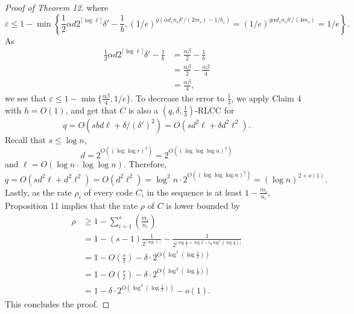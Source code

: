 \documentclass[10pt,a4paper]{article}
\begin{document}
\begin{proof}[Proof of Theorem 12]
where
\[\varepsilon\le1-\min\left\{\frac12\alpha d2^{\lceil\log\ell\rceil}\delta'-\frac1b,(1/e)^{g(\alpha d_s n_s\delta'/(2m_s)-1/b_s)}=(1/e)^{g\alpha d_s n_s\delta'/(4m_s)}=1/e\right\}.\]
As
\begin{align*}\frac12\alpha d2^{\lceil\log\ell\rceil}\delta'-\frac1b&=\frac{\alpha\beta}2-\frac1b\\&=\frac{\alpha\beta}2-\frac{\alpha\beta}4\\&=\frac{\alpha\beta}4,\end{align*}
we see that $\varepsilon\le1-\min\{\frac{\alpha\beta}4,1/e\}$. To decrease the error to $\frac13$, we apply Claim 4 with $h=O(1)$, and get that $C$ is also a $(q,\delta,\frac13)$-RLCC for
\[q=O(sbd\ell+\delta/(\delta')^2)=O(sd^2\ell+\delta d^2\ell^2).\]
Recall that $s\le\log n$,
\[d=2^{O((\log\log r)^3)}=2^{O((\log\log\log n)^3)}\]
and $\ell=O(\log n\cdot\log\log n)$. Therefore,
\[q=O(sd^2\ell+d^2\ell^2)=O(d^2\ell^2)=\log^2 n\cdot2^{O((\log\log\log n)^3)}=(\log n)^{2+o(1)}.\]
Lastly, as the rate $\rho_i$ of every code $C_i$ in the sequence is at least $1-\frac{m_i}{n_i}$, Proposition 11 implies that the rate $\rho$ of $C$ is lower bounded by
\begin{align*}\rho&\ge1-\sum_{i=1}^s\left(\frac{m_i}{n_i}\right)\\&=1-(s-1)\frac1{2^{\lceil\log\ell\rceil}}-\frac1{2^{\lfloor\log\frac1\delta+\log\beta-c_0\log^3(\log\frac1\delta)\rfloor}}\\&=1-O\left(\frac s\ell\right)-\delta\cdot2^{O(\log^3(\log\frac1\delta))}\\&=1-O\left(\frac r\ell\right)-\delta\cdot2^{O(\log^3(\log\frac1\delta))}\\&=1-\delta\cdot2^{O(\log^3(\log\frac1\delta))}-o(1).\end{align*}
This concludes the proof.
\end{proof}
\end{document}
